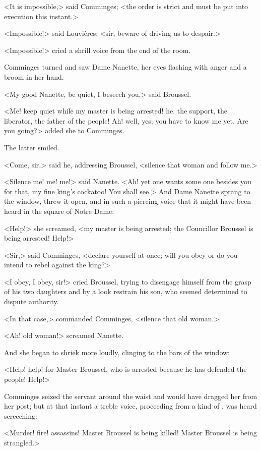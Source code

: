 <It is impossible,> said Comminges; <the order is strict and must be put into execution this instant.>

<Impossible!> said Louvières; <sir, beware of driving us to despair.>

<Impossible!> cried a shrill voice from the end of the room.

Comminges turned and saw Dame Nanette, her eyes flashing with anger and a broom in her hand.

<My good Nanette, be quiet, I beseech you,> said Broussel.

<Me! keep quiet while my master is being arrested! he, the support, the liberator, the father of the people! Ah! well, yes; you have to know me yet. Are you going?> added she to Comminges.

The latter smiled.

<Come, sir,> said he, addressing Broussel, <silence that woman and follow me.>

<Silence me! me! me!> said Nanette. <Ah! yet one wants some one besides you for that, my fine king's cockatoo! You shall see.> And Dame Nanette sprang to the window, threw it open, and in such a piercing voice that it might have been heard in the square of Notre Dame:

<Help!> she screamed, <my master is being arrested; the Councillor Broussel is being arrested! Help!>

<Sir,> said Comminges, <declare yourself at once; will you obey or do you intend to rebel against the king?>

<I obey, I obey, sir!> cried Broussel, trying to disengage himself from the grasp of his two daughters and by a look restrain his son, who seemed determined to dispute authority.

<In that case,> commanded Comminges, <silence that old woman.>

<Ah! old woman!> screamed Nanette.

And she began to shriek more loudly, clinging to the bars of the window:

<Help! help! for Master Broussel, who is arrested because he has defended the people! Help!>

Comminges seized the servant around the waist and would have dragged her from her post; but at that instant a treble voice, proceeding from a kind of , was heard screeching:

<Murder! fire! assassins! Master Broussel is being killed! Master Broussel is being strangled.>

